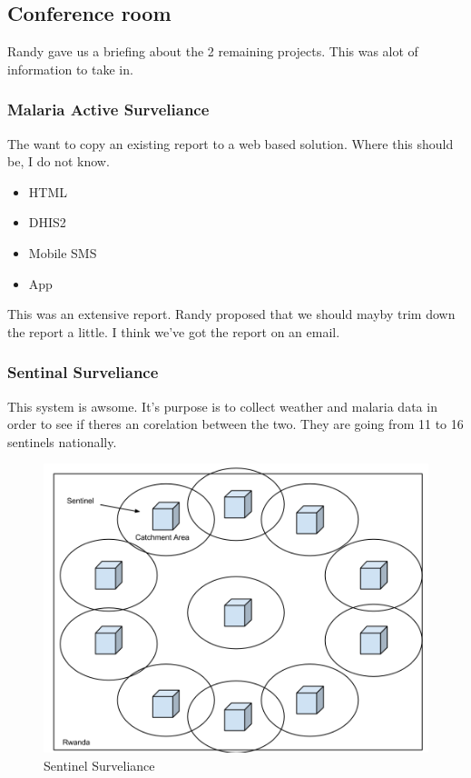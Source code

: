 \subsection{Conference room}
Randy gave us a briefing about the 2 remaining projects. This was alot of information to take in. 
\subsubsection{Malaria Active Surveliance}
The want to copy an existing report to a web based solution. Where this should be, I do not know.
\begin{itemize}
\item HTML
\item DHIS2
\item Mobile SMS
\item App
\end{itemize}
This was an extensive report. Randy proposed that we should mayby trim down the report a little. I think we've got the report on an email.
\subsubsection{Sentinal Surveliance}
This system is awsome. It's purpose is to collect weather and malaria data in order to see if theres an corelation between the two. They are going from 11 to 16 sentinels nationally. 
\begin{figure}[p]
\centering
\includegraphics[width=15cm]{appendix/images/sentinel_surveliance}
\caption{Sentinel Surveliance}
\label{Sentinel Surveliance}
\end{figure}
